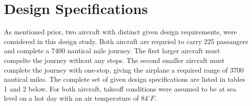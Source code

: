 \documentclass{article}
\begin{document}
    \section{Design Specifications}
    \label{sec:specs}
    \begin{flushleft}
        As mentioned prior, two aircraft with distinct given design
        requirements, were considered in this design study. Both aircraft are
        requried to carry 225 passangers and complete a 7400 nautical mile
        journey. The first larger aircraft must compelte the journey without any
        stops. The second smaller aircraft must complete the journey with
        one-stop, giving the airplane a required range of 3700 nautical miles.
        The complete set of given design specifications are listed in tables 1
        and 2 below. For both aircraft, takeoff conditions were assumed to be at
        sea level on a hot day with an air temperature of $84^{\circ}F$.
    \end{flushleft}
\end{document}
